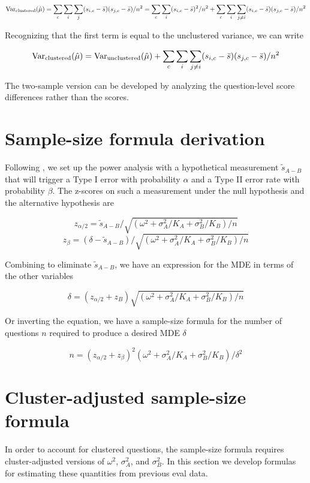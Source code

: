 \documentclass[11pt, oneside]{article}   	%
\newcommand{\Var}{\mathrm{Var}}
\begin{document}
\[
\Var_{\rm clustered}(\hat{\mu})=\sum_c \sum_i \sum_j (s_{i,c}-\bar{s})(s_{j,c}-\bar{s})/n^2=\sum_c \sum_i(s_{i,c}-\bar{s})^2/n^2+\sum_c \sum_i \sum_{j\ne i} (s_{i,c}-\bar{s})(s_{j,c}-\bar{s})/n^2
\]

Recognizing that the first term is equal to the unclustered variance, we can write

\[
\Var_{\rm clustered}(\hat{\mu})=\Var_{\rm unclustered}(\hat{\mu})+\sum_c \sum_i \sum_{j\ne i} (s_{i,c}-\bar{s})(s_{j,c}-\bar{s})/n^2
\]


The two-sample version can be developed by analyzing the question-level score differences rather than the scores.

\section{Sample-size formula derivation}
\label{apx:sample_size}

Following \cite{NBERw15701}, we set up the power analysis with a hypothetical measurement $\tilde{s}_{A-B}$ that will trigger a Type I error with probability $\alpha$ and a Type II error rate with probability $\beta$. The z-scores on such a measurement under the null hypothesis and the alternative hypothesis are

\[
z_{\alpha/2}=\tilde{s}_{A-B}/\sqrt{(\omega^2+\sigma_A^2/K_A+\sigma_B^2/K_B)/n}
\]
\[
z_\beta = (\delta - \tilde{s}_{A-B})/\sqrt{(\omega^2 + \sigma_A^2/K_A + \sigma_B^2/K_B)/n}
\]

Combining to eliminate $\tilde{s}_{A-B}$, we have an expression for the MDE in terms of the other variables

\[
\delta = (z_{\alpha/2}+z_B)\sqrt{(\omega^2+\sigma_A^2/K_A+\sigma_B^2/K_B)/n}
\]

Or inverting the equation, we have a sample-size formula for the number of questions $n$ required to produce a desired MDE $\delta$

\[
n=(z_{\alpha/2}+z_\beta)^2(\omega^2+\sigma_A^2/K_A + \sigma_B^2/K_B)/\delta^2
\]

\section{Cluster-adjusted sample-size formula}
\label{apx:cluster_sample}

In order to account for clustered questions, the sample-size formula requires cluster-adjusted versions of $\omega^2$, $\sigma_A^2$, and $\sigma_B^2$. In this section we develop formulas for estimating these quantities from previous eval data.
\end{document}
